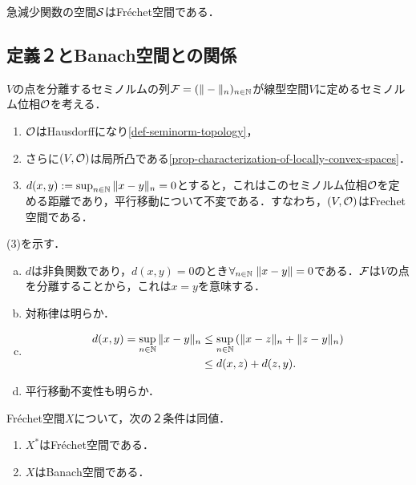 \documentclass[uplatex,dvipdfmx]{jsreport}
\begin{document}
\begin{example}
    急減少関数の空間$\mathcal{S}$はFréchet空間である．
\end{example}

\subsection{定義２とBanach空間との関係}

\begin{definition}[ゲージ空間としての捉え方]
    $V$の点を分離するセミノルムの列$\mathcal{F}=(\|-\|_n)_{n\in\mathbb{N}}$が線型空間$V$に定めるセミノルム位相$\mathcal{O}$を考える．
    \begin{enumerate}
        \item $\mathcal{O}$はHausdorffになり\ref{def-seminorm-topology}，
        \item さらに$(V,\mathcal{O})$は局所凸である\ref{prop-characterization-of-locally-convex-spaces}．
        \item $d(x,y):=\sup_{n\in\mathbb{N}}\|x-y\|_n=0$とすると，これはこのセミノルム位相$\mathcal{O}$を定める距離であり，平行移動について不変である．すなわち，$(V,\mathcal{O})$はFrechet空間である．
    \end{enumerate}
\end{definition}
\begin{Proof}
    (3)を示す．
    \begin{enumerate}[(a)]
        \item $d$は非負関数であり，$d(x,y)=0$のとき$\forall_{n\in\mathbb{N}}\;\|x-y\|=0$である．$\mathcal{F}$は$V$の点を分離することから，これは$x=y$を意味する．
        \item 対称律は明らか．
        \item \begin{align*}
            d(x,y)=\sup_{n\in\mathbb{N}}\|x-y\|_n&\le\sup_{n\in\mathbb{N}}\left(\|x-z\|_n+\|z-y\|_n\right)\\
            &\le d(x,z)+d(z,y).
        \end{align*}
        \item 平行移動不変性も明らか．
    \end{enumerate}
\end{Proof}

\begin{proposition}[Banach空間との関係]
    Fréchet空間$X$について，次の２条件は同値．
    \begin{enumerate}
        \item $X^*$はFréchet空間である．
        \item $X$はBanach空間である．
    \end{enumerate}
\end{proposition}
\end{document}
